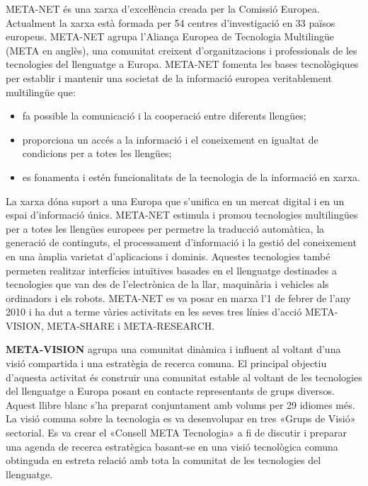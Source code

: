 \begin{multicols}{2}

META-NET és una xarxa d’exceŀlència creada per la Comissió Europea. Actualment la xarxa està formada per 54 centres d’investigació en 33 països europeus. META-NET agrupa l’Aliança Europea de Tecnologia Multilingüe (META en anglès), una comunitat creixent d’organitzacions i professionals de les tecnologies del llenguatge a Europa. META-NET fomenta les bases tecnològiques per establir i mantenir una societat de la informació europea veritablement multilingüe que:

\begin{itemize} 
\item fa possible la comunicació i la cooperació entre diferents llengües; \item proporciona un accés a la informació i el coneixement en igualtat de condicions per a totes les llengües; \item es fonamenta i estén funcionalitats de la tecnologia de la informació en xarxa.  \end{itemize}

La xarxa dóna suport a una Europa que s'unifica en un mercat digital i en un espai d'informació únics. META-NET estimula i promou tecnologies multilingües per a totes les llengües europees per permetre la traducció automàtica, la generació de continguts, el processament d’informació i la gestió del coneixement en una àmplia varietat d’aplicacions i dominis. Aquestes tecnologies també permeten realitzar interfícies intuïtives basades en el llenguatge destinades a tecnologies que van des de l'electrònica de la llar, maquinària i vehicles als ordinadors i els robots. META-NET es va posar en marxa l’1 de febrer de l’any 2010 i ha dut a terme vàries activitats en les seves tres línies d’acció META-VISION, META-SHARE i META-RESEARCH.
\columnbreak

\textbf{META-VISION} agrupa una comunitat dinàmica i influent al voltant d’una visió compartida i una estratègia de recerca comuna. El principal objectiu d’aquesta activitat és construir una comunitat estable al voltant de les tecnologies del llenguatge a Europa posant en contacte representants de grups diversos. Aquest llibre blanc s'ha preparat conjuntament amb volums per 29 idiomes més. La visió comuna sobre la tecnologia es va desenvolupar en tres «Grups de Visió» sectorial. Es va crear el «Consell META Tecnologia» a fi de discutir i preparar una agenda de recerca estratègica basant-se en una visió tecnològica comuna obtinguda en estreta relació amb tota la comunitat de les tecnologies del llenguatge.


\end{multicols}
